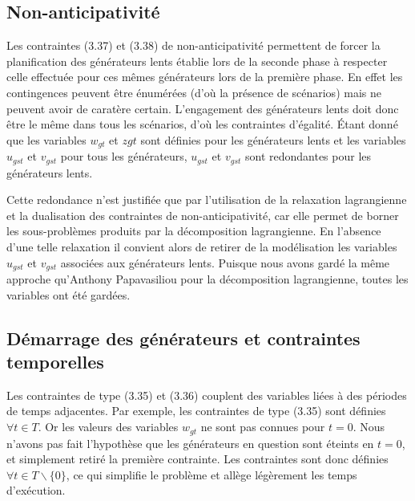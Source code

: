\subsection{Non-anticipativité}

Les contraintes (3.37) et (3.38) de non-anticipativité permettent de forcer la planification des générateurs lents établie lors de la seconde phase
à respecter celle effectuée pour ces mêmes générateurs lors de la première phase. En effet les contingences peuvent être énumérées (d'où la présence
de scénarios) mais ne peuvent avoir de caratère certain. L'engagement des générateurs lents doit donc être le même dans tous les scénarios,
d'où les contraintes d'égalité. Étant donné que les variables $w_{gt}$ et $z{gt}$ sont définies pour les générateurs lents
et les variables $u_{gst}$ et $v_{gst}$ pour tous les générateurs, $u_{gst}$ et $v_{gst}$ sont redondantes pour les générateurs lents.

Cette redondance n'est justifiée que par l'utilisation de la relaxation lagrangienne et la dualisation des contraintes de non-anticipativité, car
elle permet de borner les sous-problèmes produits par la décomposition lagrangienne. En l'absence d'une telle relaxation il convient alors de retirer 
de la modélisation les variables $u_{gst}$ et $v_{gst}$ associées aux générateurs lents. Puisque nous avons gardé la même approche qu'Anthony Papavasiliou
pour la décomposition lagrangienne, toutes les variables ont été gardées.

\subsection{Démarrage des générateurs et contraintes temporelles}

Les contraintes de type (3.35) et (3.36) couplent des variables liées à des périodes de temps adjacentes.
Par exemple, les contraintes de type (3.35) sont définies $\forall t \in T$. Or les valeurs des variables
$w_{gt}$ ne sont pas connues pour $t = 0$. Nous n'avons pas fait l'hypothèse que les générateurs en question
sont éteints en $t = 0$, et simplement retiré la première contrainte. Les contraintes sont donc définies
$\forall t \in T \backslash \{0\}$, ce qui simplifie le problème et allège légèrement les temps d'exécution.
